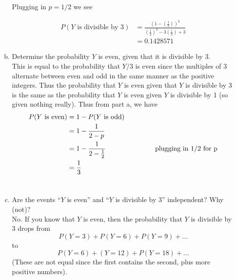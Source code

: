 \documentclass{scrartcl}
\begin{document}
\begin{enumerate}
\begin{enumerate}[a)]
Plugging in $p=1/2$ we see

\begin{align*}
  P(Y\text{ is divisible by 3}) &= \frac{(1-(\frac{1}{2}))^2}{(\frac{1}{2})^2-3(\frac{1}{2})+3}\\
  &= 0.1428571
\end{align*}
  
\item Determine the probability $Y$ is even, given that it is divisible by 3.\\
  
  This is equal to the probability that $Y/3$ is even since the multiples of 3 alternate between even and odd in the same manner as the positive integers. Thus the probability that $Y$ is even given that $Y$ is divisible by 3 is the same as the probability that $Y$ is even given $Y$ is divisible by 1 (so given nothing really). Thus from part a, we have
\begin{align*}
  P(Y\text{ is even}) &= 1 - P(Y\text{ is odd})\\
  &= 1 - \frac{1}{2-p}\\
  &= 1 - \frac{1}{2-\frac{1}{2}}\text{\hspace{1in}plugging in 1/2 for p}\\
  &= \frac{1}{3}
\end{align*}\\

\item Are the events “$Y$ is even” and “$Y$ is divisible by 3” independent? Why (not)?\\
No. If you know that $Y$ is even, then the probability that $Y$ is divisible by 3 drops from $$P(Y=3) + P(Y=6) + P(Y=9) + ...$$ to $$P(Y=6) + (Y=12) + P(Y=18) + ...$$ (These are not equal since the first contains the second, plus more positive numbers).
\end{enumerate}
\end{enumerate}
\end{document}
